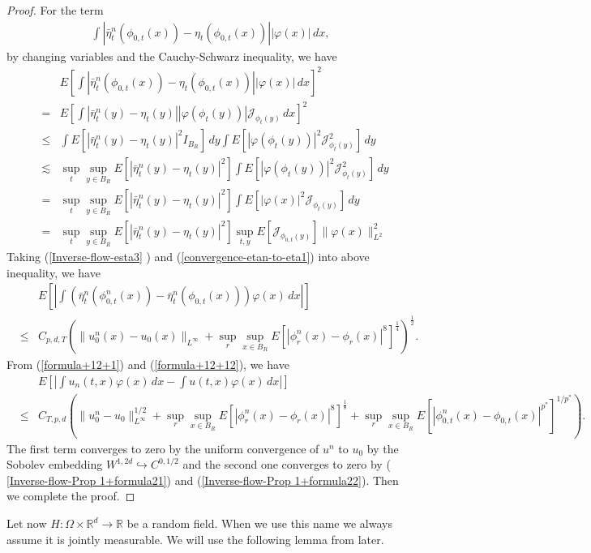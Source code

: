 \documentclass[12pt,oneside, reqno]{amsart}
\newcommand{\be}{\begin{eqnarray}}
\newcommand{\ee}{\end{eqnarray}}
\newcommand{\ce}{\begin{eqnarray*}}
\newcommand{\de}{\end{eqnarray*}}
\def\no{\nonumber}
\def\cJ{{\mathcal J}}
\def\mR{{\mathbb R}}
\def\leq{\leqslant}
\numberwithin{equation}{section}
\begin{document}
\begin{proof}
For the term 
   \ce 
   \int \left|\bar\eta_t^n(\phi_{0,t}(x))-\eta_t(\phi_{0,t}(x))\right||\varphi(x)|\, dx,
   \de 
   by changing variables and the Cauchy-Schwarz inequality, we have 
   \ce 
   &&E\left[\int \left|\bar\eta_t^n(\phi_{0,t}(x))-\eta_t(\phi_{0,t}(x))\right||\varphi(x)|\, dx\right]^2\\
  &=&E\left[\int \left|\bar\eta_t^n(y)-\eta_t(y)\right||\varphi(\phi_{t}(y))|\cJ_{\phi_{t}(y)}\, dx\right]^2\\
   &\leq &\int E\left[\left|\bar\eta_t^n(y)-\eta_t(y)\right|^2I_{B_R}\right]\,dy \int E\left[|\varphi(\phi_{t}(y))|^2\cJ_{\phi_{t}(y)}^2\right]\, dy\\
    &\lesssim &\sup_t\sup_{y\in B_R}E\left[\left|\bar\eta_t^n(y)-\eta_t(y)\right|^2\right] \int E\left[|\varphi(\phi_{t}(y))|^2\cJ_{\phi_{t}(y)}^2\right]\, dy\\
     &= &\sup_t\sup_{y\in B_R}E\left[\left|\bar\eta_t^n(y)-\eta_t(y)\right|^2\right] \int E\left[|\varphi(x)|^2\cJ_{\phi_{t}(y)}\right]\, dy\\
     &= &\sup_t\sup_{y\in B_R}E\left[\left|\bar\eta_t^n(y)-\eta_t(y)\right|^2\right] \sup_{t,y}E\left[\cJ_{\phi_{0,t}(y)}\right]\|\varphi(x)\|_{L^2}^2
   \de 
  Taking (\ref{Inverse-flow-esta3} ) and (\ref{convergence-etan-to-eta1}) into above inequality, we have 
  \be\label{formula+12+12} 
  &&E\left[\left|\int \left(\bar\eta_t^n(\phi_{0,t}^n(x))-\bar\eta_t^n(\phi_{0,t}(x))\right)\varphi(x)\, dx\right|\right]\no\\
  &\leq& C_{p,d,T} \left(\|u_0^n(x)-u_0(x)\|_{L^{\infty}}+ \sup_r\sup_{x\in B_R} E\left[|\phi_{r}^n(x)-\phi_{r}(x)|^{8}\right]^{\frac{1}{4}}\right)^{\frac{1}{2}}.
  \ee
 From  (\ref{formula+12+1}) and (\ref{formula+12+12}), we have 
 \ce 
 &&E\left[\left|\int u_n(t,x)\varphi(x) \,dx-\int u(t,x)\varphi(x) \,dx\right|\right]\\
 &\leq &C_{T,p,d}\left(\|u_0^n-u_0\|_{L^{\infty}}^{1/2}+ \sup_r\sup_{x\in B_R} E\left[|\phi_{r}^n(x)-\phi_{r}(x)|^{8}\right]^{\frac{1}{8}}+\sup_r\sup_{x\in B_R}E\left[|\phi_{0,t}^n(x)-\phi_{0,t}(x)|^{p^*}\right]^{1/p^*}\right).
 \de 
 The first term  converges to zero by the uniform convergence of $u^n$ to $u_0$ by the Sobolev embedding $W^{1,2d}\hookrightarrow C^{0,1/2}$  and the second one converges to zero by   ( \ref{Inverse-flow-Prop 1+formula21}) and (\ref{Inverse-flow-Prop 1+formula22}). Then we complete the proof.

\end{proof}

Let now $H:\Omega\times \mR^d\to \mR$ be a random field. When we use this name we always assume it is jointly measurable. We will use the following lemma from \cite[Lemma 16]{FedrizziFlandoli2013a} later.
\end{document}
